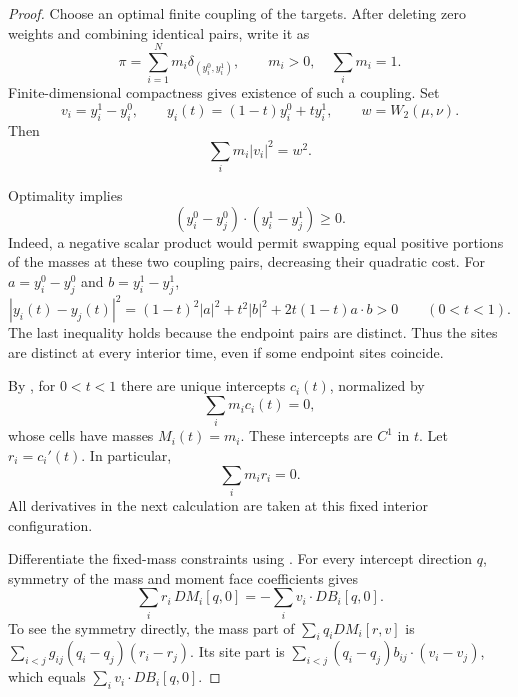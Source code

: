\begin{proof}
Choose an optimal finite coupling of the targets. After deleting zero
weights and combining identical pairs, write it as
\[
 \pi=\sum_{i=1}^N m_i\delta_{(y_i^0,y_i^1)},\qquad
 m_i>0,\quad \sum_i m_i=1.
\]
Finite-dimensional compactness gives existence of such a coupling.
Set
\[
 v_i=y_i^1-y_i^0,\qquad
 y_i(t)=(1-t)y_i^0+ty_i^1,\qquad
 w=W_2(\mu,\nu).
\]
Then
\begin{equation}
 \sum_i m_i|v_i|^2=w^2.
 \label{eq:finite-coupling-speed}
\end{equation}

Optimality implies
\begin{equation}
 (y_i^0-y_j^0)\cdot(y_i^1-y_j^1)\ge0.
 \label{eq:finite-monotonicity}
\end{equation}
Indeed, a negative scalar product would permit swapping equal positive
portions of the masses at these two coupling pairs, decreasing their
quadratic cost. For \(a=y_i^0-y_j^0\) and \(b=y_i^1-y_j^1\),
\[
 |y_i(t)-y_j(t)|^2
 =(1-t)^2|a|^2+t^2|b|^2+2t(1-t)a\cdot b>0
 \qquad(0<t<1).
\]
The last inequality holds because the endpoint pairs are distinct.
Thus the sites are distinct at every interior time, even if some
endpoint sites coincide.

By , for \(0<t<1\) there are unique intercepts
\(c_i(t)\), normalized by
\[
 \sum_i m_ic_i(t)=0,
\]
whose cells have masses \(M_i(t)=m_i\). These intercepts are \(C^1\) in
\(t\). Let \(r_i=c_i'(t)\). In particular,
\begin{equation}
 \sum_i m_ir_i=0.
 \label{eq:finite-zero-mean}
\end{equation}
All derivatives in the next calculation are taken at this fixed
interior configuration.

Differentiate the fixed-mass constraints using .
For every intercept direction \(q\), symmetry of the mass and moment
face coefficients gives
\begin{equation}
 \sum_i r_i\,DM_i[q,0]
 =-\sum_i v_i\cdot DB_i[q,0].
 \label{eq:finite-duality}
\end{equation}
To see the symmetry directly, the mass part of
\(\sum_iq_iDM_i[r,v]\) is
\(\sum_{i<j}g_{ij}(q_i-q_j)(r_i-r_j)\). Its site part is
\(\sum_{i<j}(q_i-q_j)b_{ij}\cdot(v_i-v_j)\), which equals
\(\sum_iv_i\cdot DB_i[q,0]\).


\end{proof}
